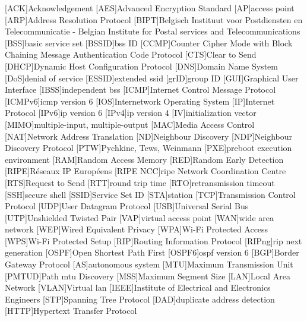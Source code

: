 
\begin{acronym}
[ACK]{Acknowledgement}
[AES]{Advanced Encryption Standard}
[AP]{access point}
[ARP]{Address Resolution Protocol}
[BIPT]{Belgisch Instituut voor Postdiensten en Telecommunicatie - Belgian Institute for Postal services and Telecommunications}
[BSS]{basic service set}
[BSSID]{\acl{bss} ID}
[CCMP]{Counter Cipher Mode with Block Chaining Message Authentication Code Protocol}
[CTS]{Clear to Send}
[DHCP]{Dynamic Host Configuration Protocol}
[DNS]{Domain Name System}
[DoS]{denial of service}
[ESSID]{extended \acl{ssid}}
[grID]{group ID}
[GUI]{Graphical User Interface}
[IBSS]{independent \acl{bss}}
[ICMP]{Internet Control Message Protocol}
[ICMPv6]{\ac{icmp} version 6}
[IOS]{Internetwork Operating System}
[IP]{Internet Protocol}
[IPv6]{\ac{ip} version 6}
[IPv4]{\ac{ip} version 4}
[IV]{initialization vector}
[MIMO]{multiple-input, multiple-output}
[MAC]{Media Access Control}
[NAT]{Network Address Translation}
[ND]{Neighbour Discovery}
[NDP]{Neighbour Discovery Protocol}
[PTW]{Pychkine, Tews, Weinmann}
[PXE]{preboot execution environment}
[RAM]{Random Access Memory}
[RED]{Random Early Detection}
[RIPE]{R\'{e}seaux IP Europ\'{e}ens}
[RIPE NCC]{\ac{ripe} Network Coordination Centre}
[RTS]{Request to Send}
[RTT]{round trip time}
[RTO]{retransmission timeout}
[SSH]{secure shell}
[SSID]{Service Set ID}
[STA]{station}
[TCP]{Transmission Control Protocol}
[UDP]{User Datagram Protocol}
[USB]{Universal Serial Bus}
[UTP]{Unshielded Twisted Pair}
[VAP]{virtual access point}
[WAN]{wide area network}
[WEP]{Wired Equivalent Privacy}
[WPA]{Wi-Fi Protected Access}
[WPS]{Wi-Fi Protected Setup}
[RIP]{Routing Information Protocol}
[RIPng]{\acs{rip} next generation}
[OSPF]{Open Shortest Path First}
[OSPF6]{\acs{ospf} version 6}
[BGP]{Border Gateway Protocol}
[AS]{autonomous system}
[MTU]{Maximum Transmission Unit}
[PMTUD]{Path \acs{mtu} Discovery}
[MSS]{Maximum Segment Size}
[LAN]{Local Area Network}
[VLAN]{Virtual \acs{lan}}
[IEEE]{Institute of Electrical and Electronics Engineers}
[STP]{Spanning Tree Protocol}
[DAD]{duplicate address detection}
[HTTP]{Hypertext Transfer Protocol}
\end{acronym}
